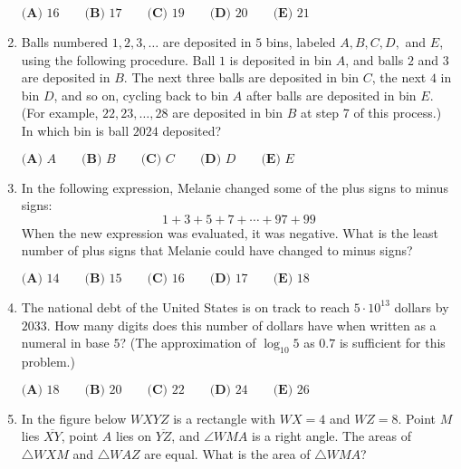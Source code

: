 \documentclass{article}
\begin{document}
\begin{enumerate}[label=\arabic*., itemsep=0.5em]
\(\textbf{(A) }16 \qquad\textbf{(B) }17\qquad\textbf{(C) }19\qquad\textbf{(D) }20\qquad\textbf{(E) }21\)\par \vspace{0.5em}\item Balls numbered \(1,2,3,\ldots\) are deposited in \(5\) bins, labeled \(A,B,C,D,\) and \(E\), using the following procedure. Ball \(1\) is deposited in bin \(A\), and balls \(2\) and \(3\) are deposited in \(B\). The next three balls are deposited in bin \(C\), the next \(4\) in bin \(D\), and so on, cycling back to bin \(A\) after balls are deposited in bin \(E\). (For example, \(22,23,\ldots,28\) are deposited in bin \(B\) at step 7 of this process.) In which bin is ball \(2024\) deposited?

\(\textbf{(A) }A\qquad\textbf{(B) }B\qquad\textbf{(C) }C\qquad\textbf{(D) }D\qquad\textbf{(E) }E\)\par \vspace{0.5em}\item In the following expression, Melanie changed some of the plus signs to minus signs:
\begin{equation*}
1 + 3+5+7+\cdots+97+99
\end{equation*}
When the new expression was evaluated, it was negative. What is the least number of plus signs that Melanie could have changed to minus signs?

\(
\textbf{(A) }14 \qquad
\textbf{(B) }15 \qquad
\textbf{(C) }16 \qquad
\textbf{(D) }17 \qquad
\textbf{(E) }18 \qquad
\)\par \vspace{0.5em}\item The national debt of the United States is on track to reach \(5 \cdot 10^{13}\) dollars by \(2033\). How many digits does this number of dollars have when written as a numeral in base \(5\)? (The approximation of \(\log_{10} 5\) as \(0.7\) is sufficient for this problem.)

\(
\textbf{(A) }18 \qquad
\textbf{(B) }20 \qquad
\textbf{(C) }22 \qquad
\textbf{(D) }24 \qquad
\textbf{(E) }26 \qquad
\)\par \vspace{0.5em}\item In the figure below \(WXYZ\) is a rectangle with \(WX=4\) and \(WZ=8\). Point \(M\) lies \(\overline{XY}\), point \(A\) lies on \(\overline{YZ}\), and \(\angle WMA\) is a right angle. The areas of \(\triangle WXM\) and \(\triangle WAZ\) are equal. What is the area of \(\triangle WMA\)?



\end{enumerate}
\end{document}
